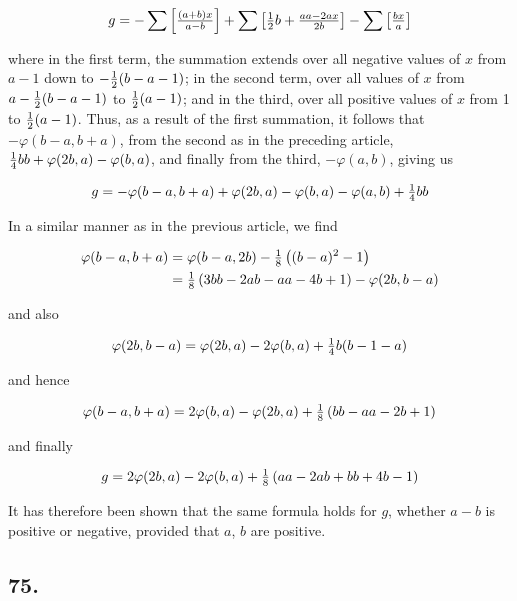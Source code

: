 \documentclass[twoside,12pt, showframe]{memoir}
\let\oldfrac\frac
\def\frac#1#2{\mathchoice{\tfrac{#1}{#2}}{\oldfrac{#1}{#2}}{\genfrac{}{}{}{2}{#1}{#2\mathstrut}}{\genfrac{}{}{}{3}{#1}{#2\mathstrut}}}
\begin{document}
\[g = -\sum\left[\frac{(a+b)x}{a-b}\right]+\sum\left[\frac{1}{2}b + \frac{a a-2ax}{2b}\right]-\sum\left[\frac{bx}{a}\right]\]

where in the first term, the summation extends over all negative values of \(x\) from \(a-1\) down to \(-\frac{1}{2}(b-a-1)\); in the second term, over all values of \(x\) from \(a-\frac{1}{2}(b-a-1)\) to \(\frac{1}{2}(a-1)\); and in the third, over all positive values of \(x\) from 1 to \(\frac{1}{2}(a-1)\). Thus, as a result of the first summation, it follows that \(-\varphi(b-a, b+a)\), from the second as in the preceding article, \(\frac{1}{4}b b + \varphi(2b, a) - \varphi(b, a)\), and finally from the third, \(-\varphi(a, b)\), giving us

\[g = -\varphi(b-a, b+a) + \varphi(2b, a) - \varphi(b, a) - \varphi(a, b) + \frac{1}{4}b b\]

In a similar manner as in the previous article, we find

\[\begin{aligned}
\varphi(b-a, b+a) & = \varphi(b-a, 2b) - \frac{1}{8}\left((b-a)^2-1\right) \\
& = \frac{1}{8}\left(3b b - 2ab - a a - 4b + 1\right) - \varphi(2b, b-a)
\end{aligned}\]

and also

\[\varphi(2b, b-a)=\varphi(2b, a)-2\varphi(b, a)+\frac{1}{4}b(b-1-a)\]

and hence

\[\varphi(b-a, b+a) = 2\varphi(b, a) - \varphi(2b, a) + \frac{1}{8}\left(b b - a a - 2b + 1\right)\]

and finally

\[g = 2\varphi(2b, a) - 2\varphi(b, a) + \frac{1}{8}\left(a a - 2ab + b b + 4b - 1\right)\]

It has therefore been shown that the same formula holds for \(g\), whether \(a-b\) is positive or negative, provided that \(a\), \(b\) are positive.
%

\subsection*{75.}
\end{document}

